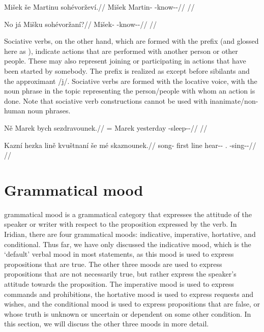 \pex
\begingl
\gla Mišek še Martinu sohévorževí.//
\glb Mišek \Com{} Martin-\Ins{} \Rec{}-know-\Av{}-\Cont{}//
\glft {}//
\endgl
\xe

\pex
\begingl
\gla No já Mišku sohévoržaní?//
\glb \Q{}  Mišek-\Ins{} \Rec{}-know-\Av{}-\Ret{}//
\glft {}//
\endgl
\xe

Sociative verbs, on the other hand, which are formed with
the prefix  (and glossed here as \Soc{}), indicate actions that are
performed with another person or other people. These may also represent joining
or participating in actions that have been started by somebody. The prefix
 is realized as  except before sibilants and the approximant
/j/. Sociative verbs are formed with the locative voice, with the noun phrase in
the topic representing the person/people with whom an action is done. Note that
sociative verb constructions cannot be used with inanimate/non-human noun
phrases.

\pex
\begingl
\gla Ně Marek bych sezdravounek.//
\glb \Pl{}= Marek yesterday \Soc{}-sleep-\Lv{}-\Pf{}//
\glft {}//
\endgl
\xe

\pex
\begingl
\gla Kazní hezka lině kvuštnaní še mé skaznounek.//
\glb song-\Gen{} first line hear-\Pv{}-\Ret{} \Com{} \First\Pl{}.\Str{} \Soc{}-sing-\Lv{}-\Pf{}//
\glft {}//
\endgl
\xe

\section{Grammatical mood}\label{sec:mood}

{\sc grammatical mood} is a grammatical category that expresses the attitude of
the speaker or writer with respect to the proposition expressed by the verb. In
Iridian, there are four grammatical moods: indicative,
imperative, hortative, and
conditional. Thus far, we have only discussed the
indicative mood, which is the `default' verbal mood in most statements, as this
mood is used to express propositions that are true. The other three moods are
used to express propositions that are not necessarily true, but rather express
the speaker's attitude towards the proposition. The imperative mood is used to
express commands and prohibitions, the hortative mood is used to express
requests and wishes, and the conditional mood is used to express propositions
that are false, or whose truth is unknown or uncertain or dependent on some
other condition. In this section, we will discuss the other three moods in more
detail.



